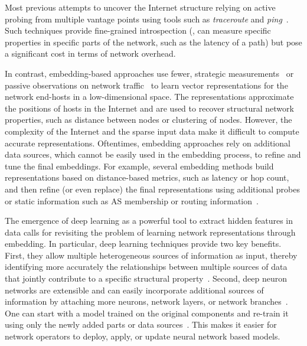 Most previous attempts to uncover the Internet structure relying on active probing from multiple vantage points using tools such as {\em traceroute} and {\em ping}~\citep{packetlab,rocketfuel}. Such techniques provide fine-grained introspection (\ie{}, can measure specific properties in specific parts of the network, such as the latency of a path) but pose a significant cost in terms of network overhead. 
%

In contrast, embedding-based approaches use fewer, strategic measurements~\citep{vivaldi,barford-sigcomm} or passive observations on network traffic~\citep{barford-imc} to learn vector representations for the network end-hosts in a low-dimensional space. The representations approximate the positions of hosts in the Internet and are used to recover structural network properties, such as distance between nodes or clustering of nodes.
%
However, the complexity of the Internet and the sparse input data make it difficult to compute accurate representations. Oftentimes, embedding approaches rely on additional data sources, which cannot be easily used in the embedding process, to refine and tune the final embeddings. For example, several embedding methods build representations based on distance-based metrics, such as latency or hop count, and then refine (or even replace) the final representations using additional probes or static information such as AS membership or routing information~\citep{vivaldi,barford-infocom}.


The emergence of deep learning as a powerful tool to extract hidden features in data calls for revisiting the problem of learning network representations through embedding. In particular, deep learning techniques provide two key benefits. First, they allow multiple heterogeneous sources of information as input, thereby identifying more accurately the relationships between multiple sources of data that jointly contribute to a specific structural property~\citep{karpathy2015deep,wang2018learning,mikolov2013exploiting}. Second, deep neuron networks are extensible and can easily incorporate additional sources of information by attaching more neurons, network layers, or network branches~\citep{wang2018learning}. One can start with a model trained on the original components and re-train it using only the newly added parts or data sources~\citep{erhan2010does}. This makes it easier for network operators to deploy, apply, or update neural network based models.


